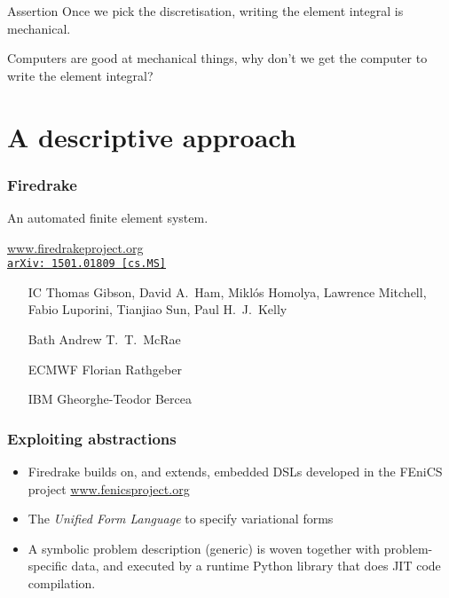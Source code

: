 \documentclass[presentation]{beamer}
\newcommand{\arxivlink}[2]{%
  \href{http://www.arxiv.org/abs/#1}%
  {{\small\texttt{arXiv:\,#1\,[#2]}}}%
}
\begin{document}
\begin{frame}[fragile]
  \begin{block}{Assertion}
    Once we pick the discretisation, writing the element integral is mechanical.
  \end{block}
  \begin{corollary}
    Computers are good at mechanical things, why don't we get the
    computer to write the element integral?
  \end{corollary}
\end{frame}

\section{A descriptive approach}

\begin{frame}
  \frametitle{Firedrake}
  An automated finite element system.

  \begin{center}
    \url{www.firedrakeproject.org}\\
    \cite{Rathgeber:2016} \arxivlink{1501.01809}{cs.MS}
  \end{center}

  \begin{itemize}
  \item[IC] Thomas Gibson, David A.~Ham, Mikl\'os Homolya, Lawrence
    Mitchell, {\color{gray}Fabio
    Luporini}, Tianjiao Sun, Paul H.~J.~Kelly
  \item[Bath] Andrew T.~T.~McRae
  \item[\color{gray}ECMWF] \color{gray}Florian Rathgeber
  \item[\color{gray}IBM] \color{gray}Gheorghe-Teodor Bercea
  \end{itemize}
\end{frame}

\begin{frame}
  \frametitle{Exploiting abstractions}
  \begin{itemize}
  \item Firedrake builds on, and extends, embedded DSLs developed in
    the FEniCS project \url{www.fenicsproject.org}
  \item The \emph{Unified Form Language} \parencite{Alnaes:2014} to
    specify variational forms
  \item A symbolic problem description (generic) is woven together with
    problem-specific data, and executed by a runtime Python library
    that does JIT code compilation.
  \end{itemize}
\end{frame}
\end{document}
